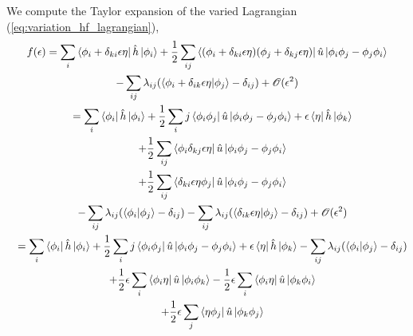     We compute the Taylor expansion of the varied Lagrangian
    (\autoref{eq:variation_hf_lagrangian}),
    \begin{gather}
        \begin{gathered}
            f(\epsilon) =
            \sum_i \bra{\phi_i + \delta_{ki}\epsilon\eta} \hat{h} \ket{\phi_i}
            + \frac{1}{2} \sum_{ij} 
            \bra{(\phi_i + \delta_{ki}\epsilon\eta)(\phi_j + \delta_{kj}\epsilon\eta)}
            \hat{u} \ket{\phi_i\phi_j - \phi_j\phi_i} \\
            - \sum_{ij} \lambda_{ij} (\bra{\phi_i + \delta_{ik} \epsilon\eta}
                \ket{\phi_j} - \delta_{ij}) + \mathscr{O}(\epsilon^2)
        \end{gathered} \\
        \quad 
        \begin{gathered}
            =
            \sum_i \bra{\phi_i} \hat{h} \ket{\phi_i} 
                + \frac{1}{2} \sum_ij \bra{\phi_i \phi_j} \hat{u} 
                    \ket{\phi_i \phi_j - \phi_j \phi_i}
                + \epsilon\bra{\eta} \hat{h} \ket{\phi_k} \\
            + \frac{1}{2} \sum_{ij}\bra{\phi_i\delta_{kj}\epsilon\eta}\hat{u}
                \ket{\phi_i\phi_j - \phi_j\phi_i} \\
            + \frac{1}{2} \sum_{ij}\bra{\delta_{ki}\epsilon\eta\phi_j}\hat{u} 
                \ket{\phi_i\phi_j - \phi_j\phi_i} \\
            - \sum_{ij} \lambda_{ij}(\braket{\phi_i}{\phi_j} - \delta_{ij})
            - \sum_{ij} \lambda_{ij}(\braket{\delta_{ik}\epsilon\eta}{\phi_j} - \delta_{ij})
                + \mathscr{O}(\epsilon^2)
        \end{gathered} \\
        \quad
        \begin{gathered}
            =
            \sum_i \bra{\phi_i} \hat{h} \ket{\phi_i} 
            + \frac{1}{2} \sum_ij \bra{\phi_i \phi_j} \hat{u} 
                    \ket{\phi_i \phi_j - \phi_j \phi_i}
            + \epsilon\bra{\eta} \hat{h} \ket{\phi_k}
            - \sum_{ij}\lambda_{ij}(\braket{\phi_i}{\phi_j} - \delta_{ij}) \\
            + \frac{1}{2} \epsilon \sum_i \bra{\phi_i\eta} \hat{u}
                \ket{\phi_i \phi_k}
            - \frac{1}{2} \epsilon \sum_i \bra{\phi_i\eta} \hat{u}
                \ket{\phi_k \phi_i} \\
            + \frac{1}{2} \epsilon \sum_j \bra{\eta\phi_j} \hat{u}
                \ket{\phi_k \phi_j}

\end{gathered}
\end{gather}
